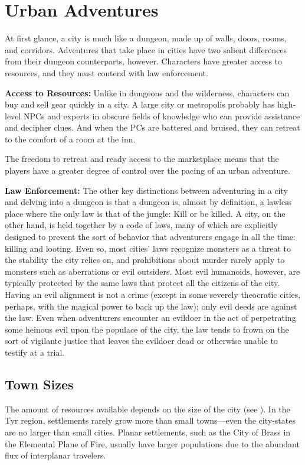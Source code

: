 \section{Urban Adventures}
At first glance, a city is much like a dungeon, made up of walls, doors, rooms, and corridors. Adventures that take place in cities have two salient differences from their dungeon counterparts, however. Characters have greater access to resources, and they must contend with law enforcement.

\textbf{Access to Resources:} Unlike in dungeons and the wilderness, characters can buy and sell gear quickly in a city. A large city or metropolis probably has high-level NPCs and experts in obscure fields of knowledge who can provide assistance and decipher clues. And when the PCs are battered and bruised, they can retreat to the comfort of a room at the inn.

The freedom to retreat and ready access to the marketplace means that the players have a greater degree of control over the pacing of an urban adventure.

\textbf{Law Enforcement:} The other key distinctions between adventuring in a city and delving into a dungeon is that a dungeon is, almost by definition, a lawless place where the only law is that of the jungle: Kill or be killed. A city, on the other hand, is held together by a code of laws, many of which are explicitly designed to prevent the sort of behavior that adventurers engage in all the time: killing and looting. Even so, most cities' laws recognize monsters as a threat to the stability the city relies on, and prohibitions about murder rarely apply to monsters such as aberrations or evil outsiders. Most evil humanoids, however, are typically protected by the same laws that protect all the citizens of the city. Having an evil alignment is not a crime (except in some severely theocratic cities, perhaps, with the magical power to back up the law); only evil deeds are against the law. Even when adventurers encounter an evildoer in the act of perpetrating some heinous evil upon the populace of the city, the law tends to frown on the sort of vigilante justice that leaves the evildoer dead or otherwise unable to testify at a trial.

\subsection{Town Sizes}
The amount of resources available depends on the size of the city (see ). In the Tyr region, settlements rarely grow more than small towns---even the city-states are no larger than small cities. Planar settlements, such as the City of Brass in the Elemental Plane of Fire, usually have larger populations due to the abundant flux of interplanar travelers.

